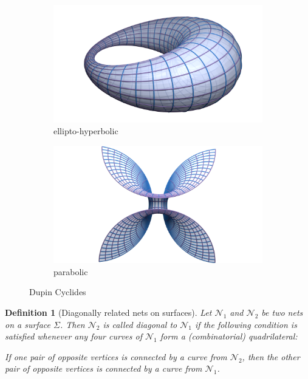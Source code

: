\documentclass[10pt, a4paper]{article}
\theoremstyle{BoldTopSpacing}
\theoremstyle{BoldTopSpacing}
\theoremstyle{BoldTopSpacing}
\theoremstyle{BoldTopBottomSpacing}
\newtheorem{definition}{Definition}[section]
\theoremstyle{BoldTopSpacing}
\theoremstyle{BoldTopBottomSpacing}
\theoremstyle{remark}
\begin{document}
\begin{figure}[H]
  \begin{subfigure}[b]{0.5\textwidth}
    \includegraphics[width=\textwidth]{Dupin-net.png}
    \caption{ellipto-hyperbolic}
    \label{fig:ellipto-hyperbolic-cyclides}
  \end{subfigure}
  \hfill
  \begin{subfigure}[b]{0.5\textwidth}
    \includegraphics[width=\textwidth]{Dupin-net-2.png}
    \caption{parabolic}
    \label{fig:parabolic-cyclides}
  \end{subfigure}
  \caption{Dupin Cyclides}
\end{figure}

\begin{definition}[Diagonally related nets on surfaces]
\label{def:diag-nets-on-surfaces}
Let $\mathcal{N}_{1}$ and $\mathcal{N}_{2}$ be two nets on a surface $\Sigma$. Then $\mathcal{N}_{2}$ is called diagonal
to $\mathcal{N}_{1}$ if the following condition is satisfied whenever any four curves of $\mathcal{N}_{1}$ form a
(combinatorial) quadrilateral: \newline
\begin{mathbox}{}
If one pair of opposite vertices is connected by a curve from $\mathcal{N}_{2}$, then the other pair of opposite vertices is connected by a curve from $\mathcal{N}_{1}$.
\end{mathbox}
\end{definition}
\end{document}
